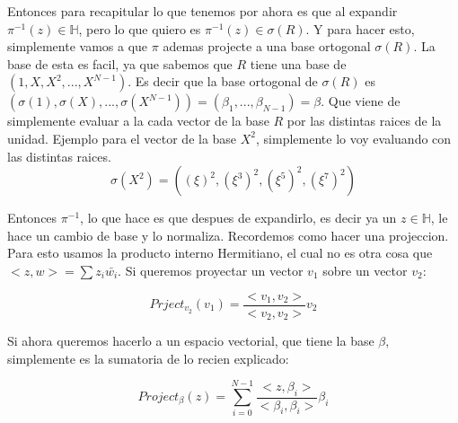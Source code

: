 \documentclass[12pt, oneside]{article}
\begin{document}
Entonces para recapitular lo que tenemos por ahora es que al expandir $\pi^{-1}(z)\in\mathbb{H}$,
pero lo que quiero es $\pi^{-1}(z)\in\sigma(R)$.
Y para hacer esto, simplemente vamos a que $\pi$ ademas projecte a una base ortogonal  $\sigma(R)$.
La base de esta es facil, ya que sabemos que $R$ tiene una base de $(1, X, X^2, ..., X^{N-1})$.
Es decir que la base ortogonal de  $\sigma(R)$ es $(\sigma(1), \sigma(X),..., \sigma(X^{N-1}))=(\beta_1,...,\beta_{N-1})=\beta$.
Que viene de simplemente evaluar a la cada vector de la base $R$ por las distintas raices de la unidad.
Ejemplo para el vector de la base $X^2$, simplemente lo voy evaluando con las distintas raices.
\begin{equation*}
    \sigma(X^2) = ((\xi)^2, (\xi^3)^2, (\xi^5)^2,(\xi^7)^2)
\end{equation*}


Entonces $\pi^{-1}$, lo que hace es que despues de expandirlo, es decir ya un $z\in\mathbb{H}$,
le hace un cambio de base y lo normaliza.
Recordemos como hacer una projeccion.
Para esto usamos la producto interno Hermitiano, el cual no es otra cosa que $<z,w>=\sum z_i\bar{w_i}$.
Si queremos proyectar un vector $v_1$ sobre un vector $v_2$:


\begin{equation*}
    Prject_{v_2}(v_1) = \frac{<v_1,v_2>}{<v_2,v_2>}v_2
    \label{eq:project}
\end{equation*}

Si ahora queremos hacerlo a un espacio vectorial, que tiene la base $\beta$, simplemente
es la sumatoria de lo recien explicado:

\begin{equation*}
    Project_{\beta}(z) = \sum_{i=0}^{N-1}\frac{<z,\beta_i>}{<\beta_i,\beta_i>}\beta_i
    \label{eq:project}
\end{equation*}
\end{document}
